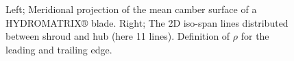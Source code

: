 \begin{figure}[h!]
\begin{minipage}[b]{0.5\linewidth}
 \centering
\end{minipage}
\begin{minipage}[b]{0.5\linewidth}
 \centering
\end{minipage}
\caption{Left; Meridional projection of the mean camber surface of a HYDROMATRIX$\circledR$ blade. Right; The 2D iso-span lines distributed between shroud and hub (here 11 lines). Definition of $\rho$ for the leading and trailing edge.}
\label{param1}
\end{figure}
 

